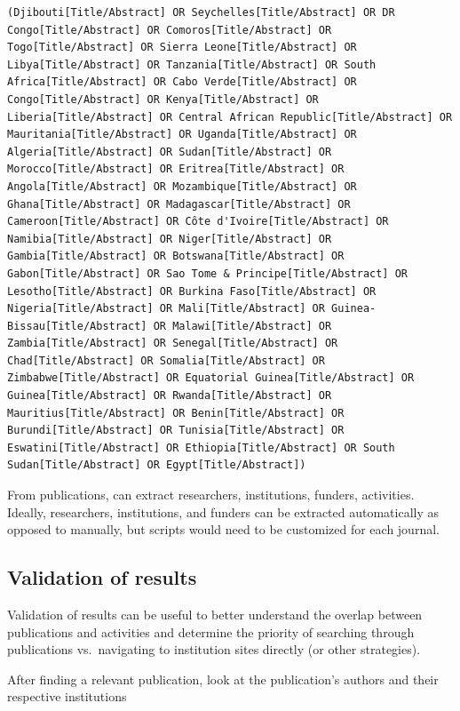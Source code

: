 \documentclass[
]{book}
\begin{document}
\begin{verbatim}
(Djibouti[Title/Abstract] OR Seychelles[Title/Abstract] OR DR Congo[Title/Abstract] OR Comoros[Title/Abstract] OR Togo[Title/Abstract] OR Sierra Leone[Title/Abstract] OR Libya[Title/Abstract] OR Tanzania[Title/Abstract] OR South Africa[Title/Abstract] OR Cabo Verde[Title/Abstract] OR Congo[Title/Abstract] OR Kenya[Title/Abstract] OR Liberia[Title/Abstract] OR Central African Republic[Title/Abstract] OR Mauritania[Title/Abstract] OR Uganda[Title/Abstract] OR Algeria[Title/Abstract] OR Sudan[Title/Abstract] OR Morocco[Title/Abstract] OR Eritrea[Title/Abstract] OR Angola[Title/Abstract] OR Mozambique[Title/Abstract] OR Ghana[Title/Abstract] OR Madagascar[Title/Abstract] OR Cameroon[Title/Abstract] OR Côte d'Ivoire[Title/Abstract] OR Namibia[Title/Abstract] OR Niger[Title/Abstract] OR Gambia[Title/Abstract] OR Botswana[Title/Abstract] OR Gabon[Title/Abstract] OR Sao Tome & Principe[Title/Abstract] OR Lesotho[Title/Abstract] OR Burkina Faso[Title/Abstract] OR Nigeria[Title/Abstract] OR Mali[Title/Abstract] OR Guinea-Bissau[Title/Abstract] OR Malawi[Title/Abstract] OR Zambia[Title/Abstract] OR Senegal[Title/Abstract] OR Chad[Title/Abstract] OR Somalia[Title/Abstract] OR Zimbabwe[Title/Abstract] OR Equatorial Guinea[Title/Abstract] OR Guinea[Title/Abstract] OR Rwanda[Title/Abstract] OR Mauritius[Title/Abstract] OR Benin[Title/Abstract] OR Burundi[Title/Abstract] OR Tunisia[Title/Abstract] OR Eswatini[Title/Abstract] OR Ethiopia[Title/Abstract] OR South Sudan[Title/Abstract] OR Egypt[Title/Abstract]) 
\end{verbatim}

From publications, can extract researchers, institutions, funders, activities. Ideally, researchers, institutions, and funders can be extracted automatically as opposed to manually, but scripts would need to be customized for each journal.

\hypertarget{validation-of-results}{%
\subsection{Validation of results}\label{validation-of-results}}

Validation of results can be useful to better understand the overlap between publications and activities and determine the priority of searching through publications vs.~navigating to institution sites directly (or other strategies).

After finding a relevant publication, look at the publication's authors and their respective institutions
\end{document}
